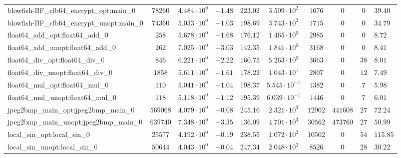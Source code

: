 \begin{tabular}{|l|c|HHc|c|c|c|cH|}
blowfish-BF\_cfb64\_encrypt\_opt:main\_0        & $ 78260    $ & $ 4.484 \cdot 10^{0} $ & $ -1.48 $ & $ 223.02 $ & $ 3.509 \cdot 10^{2}  $ & $ 1676   $ & $ 0       $ & $ 0   $ & $ 39.40   $ \\
blowfish-BF\_cfb64\_encrypt\_unopt:main\_0      & $ 74360    $ & $ 5.033 \cdot 10^{0} $ & $ -1.03 $ & $ 198.69 $ & $ 3.743 \cdot 10^{2}  $ & $ 1715   $ & $ 0       $ & $ 0   $ & $ 34.79   $ \\
float64\_add\_opt:float64\_add\_0               & $ 258      $ & $ 5.678 \cdot 10^{0} $ & $ -1.68 $ & $ 176.12 $ & $ 1.465 \cdot 10^{0}  $ & $ 2985   $ & $ 0       $ & $ 0   $ & $ 8.72    $ \\
float64\_add\_unopt:float64\_add\_0             & $ 262      $ & $ 7.025 \cdot 10^{0} $ & $ -3.03 $ & $ 142.35 $ & $ 1.841 \cdot 10^{0}  $ & $ 3168   $ & $ 0       $ & $ 0   $ & $ 8.41    $ \\
float64\_div\_opt:float64\_div\_0               & $ 846      $ & $ 6.221 \cdot 10^{0} $ & $ -2.22 $ & $ 160.75 $ & $ 5.263 \cdot 10^{0}  $ & $ 3663   $ & $ 0       $ & $ 38  $ & $ 8.01    $ \\
float64\_div\_unopt:float64\_div\_0             & $ 1858     $ & $ 5.611 \cdot 10^{0} $ & $ -1.61 $ & $ 178.22 $ & $ 1.043 \cdot 10^{1}  $ & $ 2807   $ & $ 0       $ & $ 12  $ & $ 7.49    $ \\
float64\_mul\_opt:float64\_mul\_0               & $ 110      $ & $ 5.041 \cdot 10^{0} $ & $ -1.04 $ & $ 198.37 $ & $ 5.545 \cdot 10^{-1} $ & $ 1382   $ & $ 0       $ & $ 7   $ & $ 5.98    $ \\
float64\_mul\_unopt:float64\_mul\_0             & $ 118      $ & $ 5.118 \cdot 10^{0} $ & $ -1.12 $ & $ 195.39 $ & $ 6.039 \cdot 10^{-1} $ & $ 1446   $ & $ 0       $ & $ 7   $ & $ 6.01    $ \\
jpeg2bmp\_main\_opt:jpeg2bmp\_main\_0           & $ 569068   $ & $ 4.079 \cdot 10^{0} $ & $ -0.08 $ & $ 245.16 $ & $ 2.321 \cdot 10^{3}  $ & $ 12902  $ & $ 441608  $ & $ 27  $ & $ 72.24   $ \\
jpeg2bmp\_main\_unopt:jpeg2bmp\_main\_0         & $ 639740   $ & $ 7.348 \cdot 10^{0} $ & $ -3.35 $ & $ 136.09 $ & $ 4.701 \cdot 10^{3}  $ & $ 30562  $ & $ 473760  $ & $ 27  $ & $ 50.99   $ \\
local\_sin\_opt:local\_sin\_0                   & $ 25577    $ & $ 4.192 \cdot 10^{0} $ & $ -0.19 $ & $ 238.55 $ & $ 1.072 \cdot 10^{2}  $ & $ 10502  $ & $ 0       $ & $ 54  $ & $ 115.85  $ \\
local\_sin\_unopt:local\_sin\_0                 & $ 50644    $ & $ 4.043 \cdot 10^{0} $ & $ -0.04 $ & $ 247.34 $ & $ 2.048 \cdot 10^{2}  $ & $ 8526   $ & $ 0       $ & $ 28  $ & $ 30.22   $ \\

\end{tabular}
